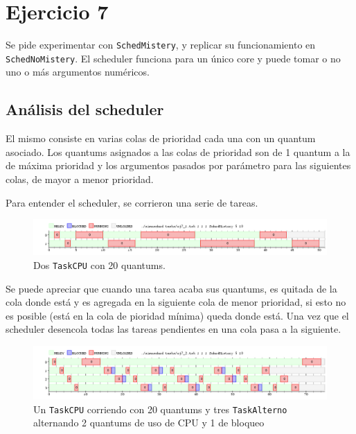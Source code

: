 \section{Ejercicio 7}
	Se pide experimentar con \texttt{SchedMistery}, y replicar su funcionamiento
	en \texttt{SchedNoMistery}.
	El scheduler funciona para un único core y puede tomar o no uno o más argumentos numéricos.

	\subsection{Análisis del scheduler}

	El mismo consiste en varias colas de prioridad cada una con un quantum
	asociado. Los quantums asignados a las colas de prioridad son de 1 quantum a la
	de máxima prioridad y los argumentos pasados por parámetro para las
	siguientes colas, de mayor a menor prioridad.

	Para entender el scheduler, se corrieron una serie de tareas.

	\begin{figure}[ht]
		\begin{center}
			\includegraphics[width=1\columnwidth]{imagenes/ej7_1.png}
			\caption{Dos \texttt{TaskCPU} con 20 quantums.}
		\end{center}
	\end{figure}

	Se puede apreciar que cuando una tarea acaba sus quantums, es quitada de la
	cola donde está y es agregada en la siguiente cola de menor
	prioridad, si esto no es posible (está en la cola de pioridad mínima) queda
	donde está. Una vez que el scheduler desencola todas las tareas pendientes en una cola pasa a la siguiente.


	\begin{figure}[ht]
		\begin{center}
			\includegraphics[width=1\columnwidth]{imagenes/ej7_2.png}
			\caption{Un \texttt{TaskCPU} corriendo con 20 quantums y tres
			\texttt{TaskAlterno} alternando 2 quantums de uso de CPU y 1 de bloqueo}
		\end{center}
	\end{figure}

